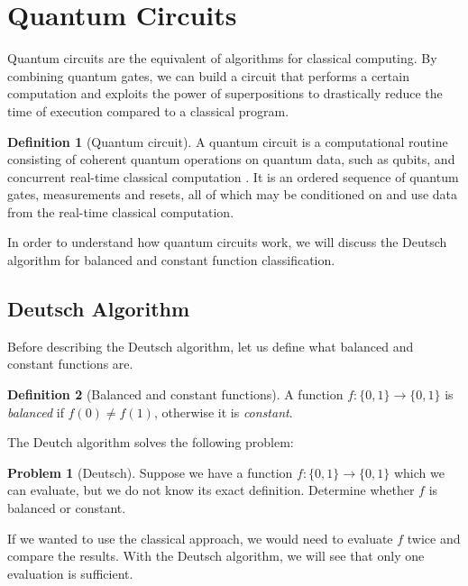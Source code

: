 \documentclass[12pt,a4paper]{report}
\theoremstyle{definition}
\newtheorem{definition}{Definition}[section]
\theoremstyle{definition}
\theoremstyle{definition}
\newtheorem{problem}{Problem}[section]
\begin{document}
\section{Quantum Circuits}
Quantum circuits are the equivalent of algorithms for classical computing. By combining quantum gates, we can build a circuit that performs a certain computation and exploits the power of superpositions to drastically reduce the time of execution compared to a classical program.
\begin{definition}[Quantum circuit]
A quantum circuit is a computational routine consisting of coherent quantum operations on quantum data, such as qubits, and concurrent real-time classical computation \cite{qsk}. It is an ordered sequence of quantum gates, measurements and resets, all of which may be conditioned on and use data from the real-time classical computation.
\end{definition}
In order to understand how quantum circuits work, we will discuss the Deutsch algorithm for balanced and constant function classification.





\subsection{Deutsch Algorithm}
Before describing the Deutsch algorithm, let us define what balanced and constant functions are.
\begin{definition}[Balanced and constant functions]
A function $f: \{0,1\} \longrightarrow \{0,1\}$ is \textit{balanced} if $f(0)\neq f(1)$, otherwise it is \textit{constant}.
\end{definition}
The Deutch algorithm solves the following problem:
\begin{problem}[Deutsch]
Suppose we have a function $f: \{0,1\} \longrightarrow \{0,1\}$ which we can evaluate, but we do not know its exact definition. Determine whether $f$ is balanced or constant.
\end{problem}
If we wanted to use the classical approach, we would need to evaluate $f$ twice and compare the results. With the Deutsch algorithm, we will see that only one evaluation is sufficient.
\end{document}
